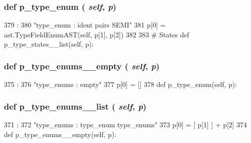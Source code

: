 \begin{DoxyVerb}
{\subsubsection[{p\_\-type\_\-enum}]{\setlength{\rightskip}{0pt plus 5cm}def p\_\-type\_\-enum ( {\em self}, \/   {\em p})}}
\label{classslicc_1_1parser_1_1SLICC_ab484be4a5214a30ffab2a0e34dcdbca6}



\begin{DoxyCode}
379                             :
380         "type_enum : ident pairs SEMI"
381         p[0] = ast.TypeFieldEnumAST(self, p[1], p[2])
382 
383     # States
    def p_type_states__list(self, p):
\end{DoxyCode}
\hypertarget{classslicc_1_1parser_1_1SLICC_a980bb7bd9ac22437c10503b52799418c}{
\subsubsection[{p\_\-type\_\-enums\_\-\_\-empty}]{\setlength{\rightskip}{0pt plus 5cm}def p\_\-type\_\-enums\_\-\_\-empty ( {\em self}, \/   {\em p})}}
\label{classslicc_1_1parser_1_1SLICC_a980bb7bd9ac22437c10503b52799418c}



\begin{DoxyCode}
375                                     :
376         "type_enums : empty"
377         p[0] = []
378 
    def p_type_enum(self, p):
\end{DoxyCode}
\hypertarget{classslicc_1_1parser_1_1SLICC_a777b7a832956d19030606b12ab13ec9a}{
\subsubsection[{p\_\-type\_\-enums\_\-\_\-list}]{\setlength{\rightskip}{0pt plus 5cm}def p\_\-type\_\-enums\_\-\_\-list ( {\em self}, \/   {\em p})}}
\label{classslicc_1_1parser_1_1SLICC_a777b7a832956d19030606b12ab13ec9a}



\begin{DoxyCode}
371                                    :
372         "type_enums : type_enum type_enums"
373         p[0] = [ p[1] ] + p[2]
374 
    def p_type_enums__empty(self, p):
\end{DoxyCode}
\hypertarget{classslicc_1_1parser_1_1SLICC_ac6f9f3e8882575559628a5c9687438e6}{
}
\end{DoxyVerb}

